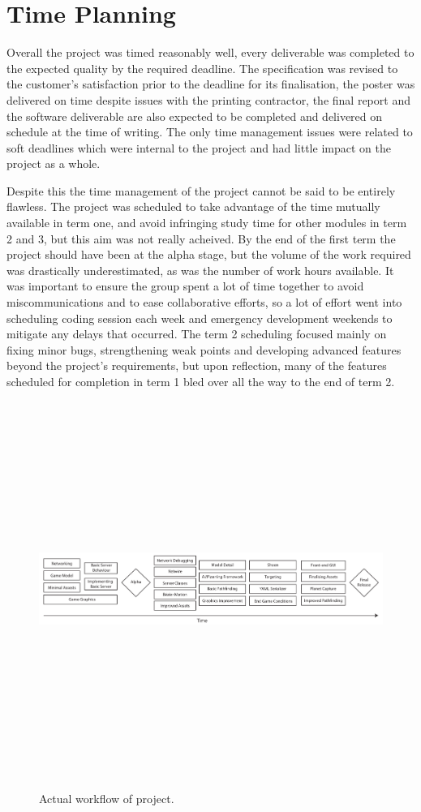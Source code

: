 \section{Time Planning}

Overall the project was timed reasonably well, every deliverable was completed to the expected quality by the required deadline. The specification was revised to the customer's satisfaction prior to the deadline for its finalisation, the poster was delivered on time despite issues with the printing contractor, the final report and the software deliverable are also expected to be completed and delivered on schedule at the time of writing. The only time management issues were related to soft deadlines which were internal to the project and had little impact on the project as a whole.

Despite this the time management of the project cannot be said to be entirely flawless.
The project was scheduled to take advantage of the time mutually available in term one, and avoid infringing study time for other modules in term 2 and 3, but this aim was not really acheived. 
By the end of the first term the project should have been at the alpha stage, but the volume of the work required was drastically underestimated, as was the number of work hours available. It was important to ensure the group spent a lot of time together to avoid miscommunications and to ease collaborative efforts, so a lot of effort went into scheduling coding session each week and emergency development weekends to mitigate any delays that occurred. The term 2 scheduling focused mainly on fixing minor bugs, strengthening weak points and developing advanced features beyond the project's requirements, but upon reflection, many of the features scheduled for completion in term 1 bled over all the way to the end of term 2. 

\begin{figure}
	\includegraphics[height=33em]{res/pm/actual_workflow_diagram}
	\label{fig:actual_workflow_diagram}
	\caption[Actual workflow of project]{Actual workflow of project.}
\end{figure}

